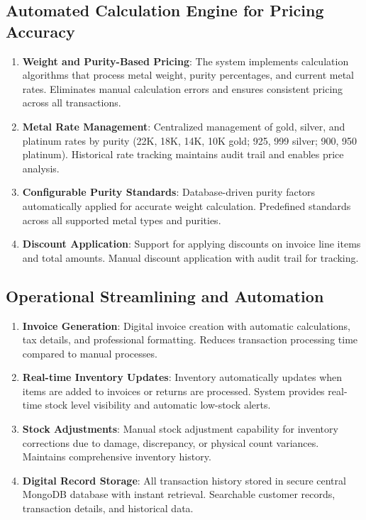 \documentclass[12pt,a4paper]{report}
\begin{document}
\subsection{Automated Calculation Engine for Pricing Accuracy}
\begin{enumerate}[label=\roman*)]
    \item \textbf{Weight and Purity-Based Pricing}: The system implements calculation algorithms that process metal weight, purity percentages, and current metal rates. Eliminates manual calculation errors and ensures consistent pricing across all transactions.
    \item \textbf{Metal Rate Management}: Centralized management of gold, silver, and platinum rates by purity (22K, 18K, 14K, 10K gold; 925, 999 silver; 900, 950 platinum). Historical rate tracking maintains audit trail and enables price analysis.
    \item \textbf{Configurable Purity Standards}: Database-driven purity factors automatically applied for accurate weight calculation. Predefined standards across all supported metal types and purities.
    \item \textbf{Discount Application}: Support for applying discounts on invoice line items and total amounts. Manual discount application with audit trail for tracking.
\end{enumerate}

\subsection{Operational Streamlining and Automation}
\begin{enumerate}[label=\roman*)]
    \item \textbf{Invoice Generation}: Digital invoice creation with automatic calculations, tax details, and professional formatting. Reduces transaction processing time compared to manual processes.
    \item \textbf{Real-time Inventory Updates}: Inventory automatically updates when items are added to invoices or returns are processed. System provides real-time stock level visibility and automatic low-stock alerts.
    \item \textbf{Stock Adjustments}: Manual stock adjustment capability for inventory corrections due to damage, discrepancy, or physical count variances. Maintains comprehensive inventory history.
    \item \textbf{Digital Record Storage}: All transaction history stored in secure central MongoDB database with instant retrieval. Searchable customer records, transaction details, and historical data.
\end{enumerate}
\end{document}
